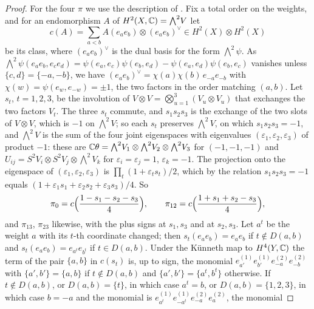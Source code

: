 \begin{proof}
For the four $\pi$ we use the description of . Fix a
total order on the weights, and for an endomorphism $A$ of
$H^{2}(X,\mathbb{C})={\textstyle\bigwedge^{2}}V$ let
\[
  c(A)=\sum_{a<b}A(e_{a}e_{b})\otimes(e_{a}e_{b})^{\vee}
  \in H^{2}(X)\otimes H^{2}(X)
\]
be its class, where $(e_{a}e_{b})^{\vee}$ is the dual basis for the form
${\textstyle\bigwedge^{2}}\psi$. As
${\textstyle\bigwedge^{2}}\psi(e_{a}e_{b},e_{c}e_{d})
=\psi(e_{a},e_{c})\psi(e_{b},e_{d})-\psi(e_{a},e_{d})\psi(e_{b},e_{c})$
vanishes unless $\{c,d\}=\{-a,-b\}$, we have
$(e_{a}e_{b})^{\vee}=\chi(a)\chi(b)\,e_{-a}e_{-b}$ with
$\chi(w)=\psi(e_{w},e_{-w})=\pm1$, the two factors in the order matching
$(a,b)$. Let $s_{t}$, $t=1,2,3$, be the involution of
$V\otimes V=\bigotimes_{u=1}^{3}(V_{u}\otimes V_{u})$ that exchanges the two
factors $V_{t}$. The three $s_{t}$ commute, and $s_{1}s_{2}s_{3}$ is the
exchange of the two slots of $V\otimes V$, which is $-1$ on
${\textstyle\bigwedge^{2}}V$; so each $s_{t}$ preserves
${\textstyle\bigwedge^{2}}V$, on which $s_{1}s_{2}s_{3}=-1$, and
${\textstyle\bigwedge^{2}}V$ is the sum of the four joint eigenspaces with
eigenvalues $(\varepsilon_{1},\varepsilon_{2},\varepsilon_{3})$ of product
$-1$: these are $\mathbb{C}\theta={\textstyle\bigwedge^{2}}V_{1}\otimes
{\textstyle\bigwedge^{2}}V_{2}\otimes{\textstyle\bigwedge^{2}}V_{3}$ for
$(-1,-1,-1)$ and $U_{ij}=S^{2}V_{i}\otimes S^{2}V_{j}\otimes
{\textstyle\bigwedge^{2}}V_{k}$ for $\varepsilon_{i}=\varepsilon_{j}=1$,
$\varepsilon_{k}=-1$. The projection onto the eigenspace of
$(\varepsilon_{1},\varepsilon_{2},\varepsilon_{3})$ is
$\prod_{t}(1+\varepsilon_{t}s_{t})/2$, which by the relation
$s_{1}s_{2}s_{3}=-1$ equals
$(1+\varepsilon_{1}s_{1}+\varepsilon_{2}s_{2}+\varepsilon_{3}s_{3})/4$. So
\[
  \pi_{0}=c\Bigl(\frac{1-s_{1}-s_{2}-s_{3}}{4}\Bigr),\qquad
  \pi_{12}=c\Bigl(\frac{1+s_{1}+s_{2}-s_{3}}{4}\Bigr),
\]
and $\pi_{13}$, $\pi_{23}$ likewise, with the plus signs at $s_{1},s_{3}$
and at $s_{2},s_{3}$. Let $a^{t}$ be the weight $a$ with its $t$-th
coordinate changed; then $s_{t}(e_{a}e_{b})=e_{a}e_{b}$ if $t\notin D(a,b)$
and $s_{t}(e_{a}e_{b})=e_{a^{t}}e_{b^{t}}$ if $t\in D(a,b)$. Under the
K\"unneth map to $H^{4}(Y,\mathbb{C})$ the term of the pair $\{a,b\}$ in $c(s_{t})$
is, up to sign, the monomial $e^{(1)}_{a'}e^{(1)}_{b'}e^{(2)}_{-a}e^{(2)}_{-b}$
with $\{a',b'\}=\{a,b\}$ if $t\notin D(a,b)$ and $\{a',b'\}=\{a^{t},b^{t}\}$
otherwise. If $t\notin D(a,b)$, or $D(a,b)=\{t\}$, in which case $a^{t}=b$,
or $D(a,b)=\{1,2,3\}$, in which case $b=-a$ and the monomial is
$e^{(1)}_{a^{t}}e^{(1)}_{-a^{t}}e^{(2)}_{-a}e^{(2)}_{a}$, the monomial

\end{proof}
